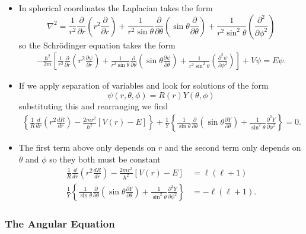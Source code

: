\documentclass{article}
\begin{document}
\begin{itemize}
  \item In spherical coordinates the Laplacian takes the form \[\nabla^2 = \frac{1}{r^2} \frac{\partial}{\partial r} \left( r^2 \frac{\partial}{\partial r} \right) + \frac{1}{r^2 \sin \theta} \frac{\partial}{\partial \theta} \left( \sin \theta \frac{\partial}{\partial \theta} \right) + \frac{1}{r^2 \sin^2 \theta} \left( \frac{\partial^2}{\partial \phi^2} \right)\] so the Schrödinger equation takes the form \begin{align*}
    -\frac{\hbar^2}{2 m} \left[ \frac{1}{r^2} \frac{\partial}{\partial r} \left( r^2 \frac{\partial \psi}{\partial r} \right) + \frac{1}{r^2 \sin \theta} \frac{\partial}{\partial \theta} \left( \sin \theta \frac{\partial \psi}{\partial \theta} \right) + \frac{1}{r^2 \sin^2 \theta} \left( \frac{\partial^2 \psi}{\partial \phi^2} \right) \right] + V \psi = E \psi.
  \end{align*}

  \item If we apply separation of variables and look for solutions of the form \[\psi(r, \theta, \phi) = R(r) Y(\theta, \phi)\] substituting this and rearranging we find \begin{align*}
    \left\{ \frac{1}{R} \frac{d}{d r} \left( r^2 \frac{d R}{d r} \right) - \frac{2 m r^2}{\hbar^2} [V(r) - E] \right\} + \frac{1}{Y} \left\{ \frac{1}{\sin \theta} \frac{\partial}{\partial \theta} \left( \sin \theta \frac{\partial Y}{\partial \theta} \right) + \frac{1}{\sin^2 \theta} \frac{\partial^2 Y}{\partial \phi^2} \right\} = 0.
  \end{align*}

  \item The first term above only depends on $r$ and the second term only depends on $\theta$ and $\phi$ so they both must be constant \begin{align*}
    \frac{1}{R} \frac{d}{d r} \left( r^2 \frac{d R}{d r} \right) - \frac{2 m r^2}{\hbar^2} [V(r) - E] &= \ell (\ell + 1) \\
    \frac{1}{Y} \left\{ \frac{1}{\sin \theta} \frac{\partial}{\partial \theta} \left( \sin \theta \frac{\partial Y}{\partial \theta} \right) + \frac{1}{\sin^2 \theta} \frac{\partial^2 Y}{\partial \phi^2} \right\} &= -\ell (\ell + 1).
  \end{align*}
\end{itemize}

\subsubsection{The Angular Equation}
\end{document}
